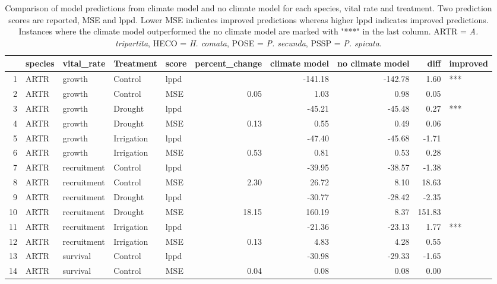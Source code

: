 \begin{longtable}{rllllrrrrl}
\caption{Comparison of model predictions from climate model and no climate model for each species, vital rate and treatment.  Two prediction scores are reported, MSE and lppd. Lower MSE indicates improved predictions whereas higher lppd indicates improved predictions.  Instances where the climate model outperformed the no climate model are marked with "***" in the last column. ARTR = \textit{A. tripartita}, HECO = \textit{H. comata}, POSE = \textit{P. secunda}, PSSP = \textit{P. spicata}.} \\ 
  \hline
 & species & vital\_rate & Treatment & score & percent\_change & climate model & no climate model & diff & improved \\ 
  \hline
\endhead
\hline
1 & ARTR & growth & Control & lppd &  & -141.18 & -142.78 & 1.60 & *** \\ 
  2 & ARTR & growth & Control & MSE & 0.05 & 1.03 & 0.98 & 0.05 &  \\ 
  3 & ARTR & growth & Drought & lppd &  & -45.21 & -45.48 & 0.27 & *** \\ 
  4 & ARTR & growth & Drought & MSE & 0.13 & 0.55 & 0.49 & 0.06 &  \\ 
  5 & ARTR & growth & Irrigation & lppd &  & -47.40 & -45.68 & -1.71 &  \\ 
  6 & ARTR & growth & Irrigation & MSE & 0.53 & 0.81 & 0.53 & 0.28 &  \\ 
  7 & ARTR & recruitment & Control & lppd &  & -39.95 & -38.57 & -1.38 &  \\ 
  8 & ARTR & recruitment & Control & MSE & 2.30 & 26.72 & 8.10 & 18.63 &  \\ 
  9 & ARTR & recruitment & Drought & lppd &  & -30.77 & -28.42 & -2.35 &  \\ 
  10 & ARTR & recruitment & Drought & MSE & 18.15 & 160.19 & 8.37 & 151.83 &  \\ 
  11 & ARTR & recruitment & Irrigation & lppd &  & -21.36 & -23.13 & 1.77 & *** \\ 
  12 & ARTR & recruitment & Irrigation & MSE & 0.13 & 4.83 & 4.28 & 0.55 &  \\ 
  13 & ARTR & survival & Control & lppd &  & -30.98 & -29.33 & -1.65 &  \\ 
  14 & ARTR & survival & Control & MSE & 0.04 & 0.08 & 0.08 & 0.00 &  \\ 

\end{longtable}
